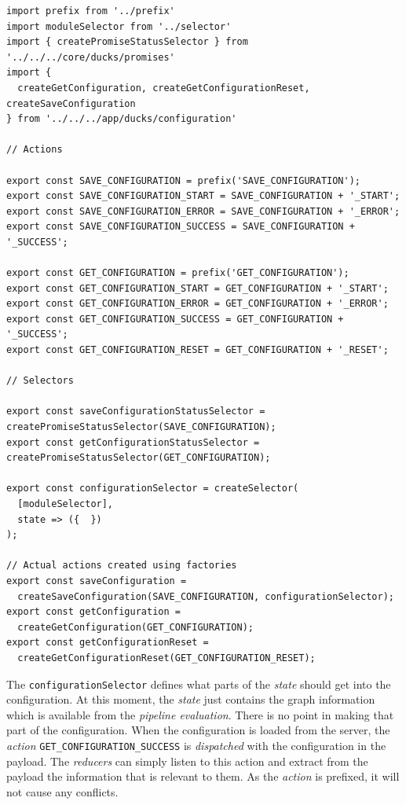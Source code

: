 \begin{verbatim}
import prefix from '../prefix'
import moduleSelector from '../selector'
import { createPromiseStatusSelector } from '../../../core/ducks/promises'
import { 
  createGetConfiguration, createGetConfigurationReset, createSaveConfiguration 
} from '../../../app/ducks/configuration'

// Actions

export const SAVE_CONFIGURATION = prefix('SAVE_CONFIGURATION');
export const SAVE_CONFIGURATION_START = SAVE_CONFIGURATION + '_START';
export const SAVE_CONFIGURATION_ERROR = SAVE_CONFIGURATION + '_ERROR';
export const SAVE_CONFIGURATION_SUCCESS = SAVE_CONFIGURATION + '_SUCCESS';

export const GET_CONFIGURATION = prefix('GET_CONFIGURATION');
export const GET_CONFIGURATION_START = GET_CONFIGURATION + '_START';
export const GET_CONFIGURATION_ERROR = GET_CONFIGURATION + '_ERROR';
export const GET_CONFIGURATION_SUCCESS = GET_CONFIGURATION + '_SUCCESS';
export const GET_CONFIGURATION_RESET = GET_CONFIGURATION + '_RESET';

// Selectors

export const saveConfigurationStatusSelector = createPromiseStatusSelector(SAVE_CONFIGURATION);
export const getConfigurationStatusSelector = createPromiseStatusSelector(GET_CONFIGURATION);

export const configurationSelector = createSelector(
  [moduleSelector],
  state => ({  })
);

// Actual actions created using factories
export const saveConfiguration = 
  createSaveConfiguration(SAVE_CONFIGURATION, configurationSelector);
export const getConfiguration = 
  createGetConfiguration(GET_CONFIGURATION);
export const getConfigurationReset = 
  createGetConfigurationReset(GET_CONFIGURATION_RESET);
\end{verbatim}

The \texttt{configurationSelector} defines what parts of the \emph{state} should get into the configuration. At this moment, the \emph{state} just contains the graph information which is available from the \emph{pipeline evaluation}. There is no point in making that part of the configuration. When the configuration is loaded from the server, the \emph{action} \texttt{GET\_CONFIGURATION\_SUCCESS} is \emph{dispatched} with the configuration in the payload. The \emph{reducers} can simply listen to this action and extract from the payload the information that is relevant to them. As the \emph{action} is prefixed, it will not cause any conflicts.

